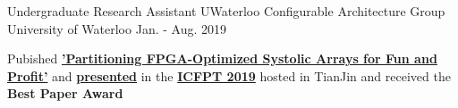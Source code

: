 


\begin{cventries}


\cventry
{Undergraduate Research Assistant} %
{UWaterloo Configurable Architecture Group} %
{University of Waterloo} %
{Jan. - Aug. 2019} %
{ %
\begin{cvitems}
\item {
    Pubished  
    \textbf{
        \href{https://git.uwaterloo.ca/watcag-public/fpga-syspart}
        {'Partitioning FPGA-Optimized Systolic Arrays for Fun and Profit'}}
    and 
    \textbf{
        \href{https://www.youtube.com/watch?v=nVLZWJdZ-64}
        {presented}}
    in the 
    \textbf{
        \href{http://fpt19.tju.edu.cn/Registration.htm}
        {ICFPT 2019}}
    hosted in TianJin and received the \textbf{Best Paper Award}
}
\end{cvitems}
}



\end{cventries}